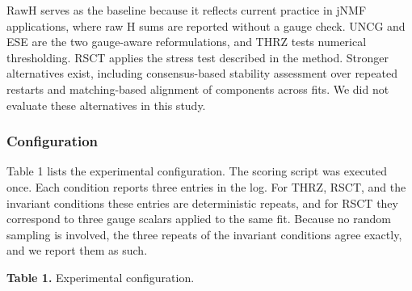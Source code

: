 \documentclass{article}
\begin{document}
RawH serves as the baseline because it reflects current practice in jNMF applications, where raw H sums are reported without a gauge check. UNCG and ESE are the two gauge-aware reformulations, and THRZ tests numerical thresholding. RSCT applies the stress test described in the method. Stronger alternatives exist, including consensus-based stability assessment over repeated restarts and matching-based alignment of components across fits. We did not evaluate these alternatives in this study.

\subsubsection{Configuration}

\label{sec:configuration}

Table 1 lists the experimental configuration. The scoring script was executed once. Each condition reports three entries in the log. For THRZ, RSCT, and the invariant conditions these entries are deterministic repeats, and for RSCT they correspond to three gauge scalars applied to the same fit. Because no random sampling is involved, the three repeats of the invariant conditions agree exactly, and we report them as such.

\textbf{Table 1.} Experimental configuration.

\begin{table}[ht]
\centering
\caption{Hyperparameter settings}
\label{tab:1}
\end{table}
\end{document}
